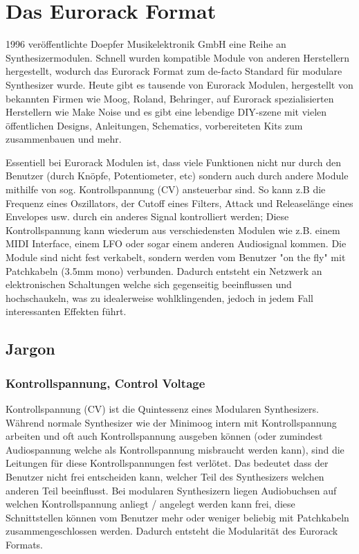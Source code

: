 \section{Das Eurorack Format}
\label{sec:orgc10323e}

1996 veröffentlichte Doepfer Musikelektronik GmbH eine Reihe an Synthesizermodulen. Schnell wurden kompatible Module von anderen Herstellern hergestellt, wodurch das Eurorack Format zum de-facto Standard für modulare Synthesizer wurde. Heute gibt es tausende von Eurorack Modulen, hergestellt von bekannten Firmen wie Moog, Roland, Behringer, auf Eurorack spezialisierten Herstellern wie Make Noise und es gibt eine lebendige DIY-szene mit vielen öffentlichen Designs, Anleitungen, Schematics, vorbereiteten Kits zum zusammenbauen und mehr.

Essentiell bei Eurorack Modulen ist, dass viele Funktionen nicht nur durch den Benutzer (durch Knöpfe, Potentiometer, etc) sondern auch durch andere Module mithilfe von sog. Kontrollspannung (CV) ansteuerbar sind. So kann z.B die Frequenz eines Oszillators, der Cutoff eines Filters, Attack und Releaselänge eines Envelopes usw. durch ein anderes Signal kontrolliert werden; Diese Kontrollspannung kann wiederum aus verschiedensten Modulen wie z.B. einem MIDI Interface, einem LFO oder sogar einem anderen Audiosignal kommen. Die Module sind nicht fest verkabelt, sondern werden vom Benutzer "on the fly" mit Patchkabeln (3.5mm mono) verbunden. Dadurch entsteht ein Netzwerk an elektronischen Schaltungen welche sich gegenseitig beeinflussen und hochschaukeln, was zu idealerweise wohlklingenden, jedoch in jedem Fall interessanten Effekten führt.

\subsection{Jargon}
\label{sec:orgd272e55}
\subsubsection{Kontrollspannung, Control Voltage}
\label{sec:org93588ce}
Kontrollspannung (CV) ist die Quintessenz eines Modularen Synthesizers. Während normale Synthesizer wie der Minimoog intern mit Kontrollspannung arbeiten und oft auch Kontrollspannung ausgeben können (oder zumindest Audiospannung welche als Kontrollspannung misbraucht werden kann), sind die Leitungen für diese Kontrollspannungen fest verlötet. Das bedeutet dass der Benutzer nicht frei entscheiden kann, welcher Teil des Synthesizers welchen anderen Teil beeinflusst. Bei modularen Synthesizern liegen Audiobuchsen auf welchen Kontrollspannung anliegt / angelegt werden kann frei, diese Schnittstellen können vom Benutzer mehr oder weniger beliebig mit Patchkabeln zusammengeschlossen werden. Dadurch entsteht die Modularität des Eurorack Formats.


